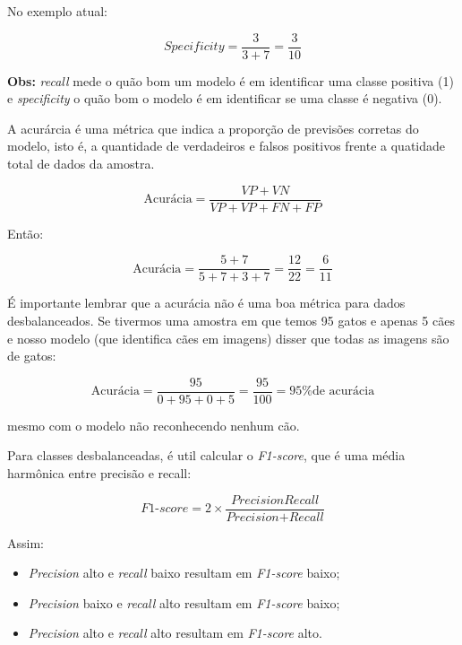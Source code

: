 \documentclass{article}
\begin{document}
No exemplo atual:

\begin{equation*}
    \textit{Specificity} = \frac{3}{3 + 7} = \frac{3}{10}
\end{equation*}

\textbf{Obs:} \textit{recall} mede o quão bom um modelo é em identificar 
uma classe positiva (1) e \textit{specificity} o quão bom o modelo é em 
identificar se uma classe é negativa (0).

A acurárcia é uma métrica que indica a proporção de previsões corretas 
do modelo, isto é, a quantidade de verdadeiros e falsos positivos frente
a quatidade total de dados da amostra.

\begin{equation}
    \text{Acurácia} = \frac{VP + VN}{VP + VP + FN + FP}
\end{equation}

Então:

\begin{equation*}
    \text{Acurácia} = \frac{5 + 7}{5 + 7 + 3 + 7} = \frac{12}{22} = \frac{6}{11}
\end{equation*}

É importante lembrar que a acurácia não é uma boa métrica para dados desbalanceados.
Se tivermos uma amostra em que temos 95 gatos e apenas 5 cães e nosso modelo (que 
identifica cães em imagens) disser que todas as imagens são de gatos:

\begin{equation*}
    \text{Acurácia} = \frac{95}{0 + 95 + 0 +5} = \frac{95}{100} = \text{95\% de acurácia}
\end{equation*}

mesmo com o modelo não reconhecendo nenhum cão.

Para classes desbalanceadas, é util calcular o \textit{F1-score},
que é uma média harmônica entre precisão e recall:

\begin{equation}
    \textit{F1-score} = 2 \times \frac{\textit{Precision} \textit{Recall}}{\textit{Precision} + \textit{Recall}}
\end{equation}

Assim:

\begin{itemize}
    \item \textit{Precision} alto e \textit{recall} baixo resultam em \textit{F1-score} baixo;
    \item \textit{Precision} baixo e \textit{recall} alto resultam em \textit{F1-score} baixo;
    \item \textit{Precision} alto e \textit{recall} alto resultam em \textit{F1-score} alto.
\end{itemize}
\end{document}

